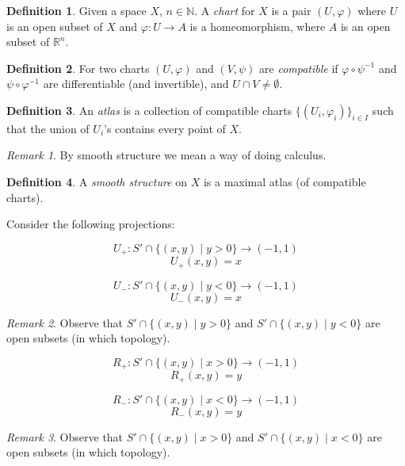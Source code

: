 \documentclass[11pt]{article}
\theoremstyle{definition}
\newtheorem{definition}{Definition}[section]
\theoremstyle{remark}
\newtheorem{remark}{Remark}[section]
\begin{document}
\begin{definition}\label{def:chart}
Given a space $X$, $n \in \mathbb{N}$.
A \emph{chart} for $X$ is a pair $(U, \varphi)$ where $U$ is an open subset of $X$ and $\varphi \colon U \to A$ is a homeomorphism, where $A$ is an open subset of $\mathbb{R}^n$.
\end{definition}

\begin{definition}\label{def:compatible_chart}
For two charts $(U, \varphi)$ and $(V, \psi)$ are \emph{compatible} if $\varphi \circ \psi^{-1}$ and $\psi \circ \varphi^{-1}$ are differentiable (and invertible), and $U \cap V \neq \emptyset$.
\end{definition}

\begin{definition}\label{def:atlas_gen}
An \emph{atlas} is a collection of compatible charts $\{(U_i, \varphi_i)\}_{i \in I}$ such that the union of $U_i$'s contains every point of $X$.
\end{definition}

\begin{remark}\label{rem:smooth_structure_intro}
By smooth structure we mean a way of doing calculus.
\end{remark}

\begin{definition}\label{def:smooth_structure}
A \emph{smooth structure} on $X$ is a maximal atlas (of compatible charts).
\end{definition}

Consider the following projections:

\[
U_+ \colon S' \cap \{(x,y) \mid y > 0\} \to (-1,1)
\]
\[
U_+(x,y) = x
\]

\[
U_- \colon S' \cap \{(x,y) \mid y < 0\} \to (-1,1)
\]
\[
U_-(x,y) = x
\]

\begin{remark}\label{rem:open_subsets_y}
Observe that $S' \cap \{(x,y) \mid y > 0\}$ and $S' \cap \{(x,y) \mid y < 0\}$ are open subsets (in which topology).
\end{remark}

\[
R_+ \colon S' \cap \{(x,y) \mid x > 0\} \to (-1,1)
\]
\[
R_+(x,y) = y
\]

\[
R_- \colon S' \cap \{(x,y) \mid x < 0\} \to (-1,1)
\]
\[
R_-(x,y) = y
\]

\begin{remark}\label{rem:open_subsets_x}
Observe that $S' \cap \{(x,y) \mid x > 0\}$ and $S' \cap \{(x,y) \mid x < 0\}$ are open subsets (in which topology).
\end{remark}
\end{document}
